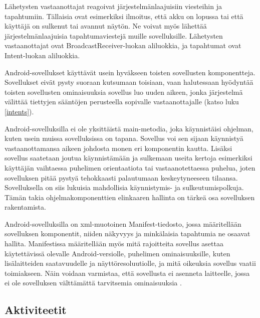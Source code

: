 Lähetysten vastaanottajat reagoivat järjestelmänlaajuisiin viesteihin ja tapahtumiin. Tällaisia ovat esimerkiksi ilmoitus, että akku on lopussa tai että käyttäjä on sulkenut tai avannut näytön. Ne voivat myös lähettää järjestelmänlaajuisia tapahtumaviestejä muille sovelluksille. Lähetysten vastaanottajat ovat BroadcastReceiver-luokan aliluokkia, ja tapahtumat ovat Intent-luokan aliluokkia.

Android-sovellukset käyttävät usein hyväkseen toisten sovellusten komponentteja. Sovellukset eivät pysty suoraan kutsumaan toisiaan, vaan halutessaan hyödyntää toisten sovellusten ominaisuuksia sovellus luo uuden aikeen, jonka järjestelmä välittää tiettyjen sääntöjen perusteella sopivalle vastaanottajalle (katso luku \ref{intents}). 

Android-sovelluksilla ei ole yksittäistä main-metodia, joka käynnistäisi ohjelman, kuten usein muissa sovelluksissa on tapana. Sovellus voi sen sijaan käynnistyä vastaanottamansa aikeen johdosta monen eri komponentin kautta. Lisäksi sovellus saatetaan joutua käynnistämään ja sulkemaan useita kertoja esimerkiksi käyttäjän vaihtaessa puhelimen orientaatiota tai vastaanotettaessa puhelua, joten sovelluksen pitää pystyä tehokkaasti palautumaan keskeytyneeseen tilaansa. Sovelluksella on siis lukuisia mahdollisia käynnistymis- ja sulkeutumispolkuja. Tämän takia ohjelmakomponenttien elinkaaren hallinta on tärkeä osa sovelluksen rakentamista.

Android-sovelluksilla on xml-muotoinen Manifest-tiedosto, jossa määritellään sovelluksen komponentit, niiden näkyvyys ja minkälaisia tapahtumia ne osaavat hallita. Manifestissa määritellään myös mitä rajoitteita sovellus asettaa käytettävissä olevalle Android-versiolle, puhelimen ominaisuuksille, kuten lisälaitteiden saatavuudelle ja näyttöresoluutiolle, ja mitä oikeuksia sovellus vaatii toimiakseen. Näin voidaan varmistaa, että sovellusta ei asenneta laitteelle, jossa ei ole sovelluksen välttämättä tarvitsemia ominaisuuksia \cite{android}.

\subsection{Aktiviteetit}

